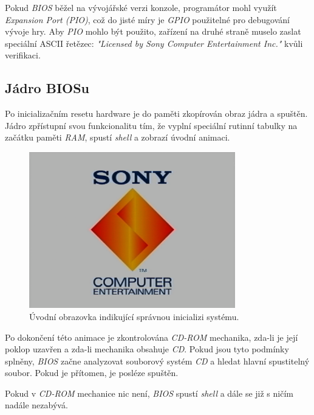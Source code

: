 Pokud \textit{BIOS} běžel na vývojářské verzi konzole, programátor mohl využít \textit{Expansion Port (PIO)}, což
do jisté míry je \textit{GPIO} použitelné pro debugování vývoje hry. Aby \textit{PIO} mohlo být použito,
zařízení na druhé straně muselo zaslat speciální ASCII řetězec: \textit{"Licensed by Sony Computer Entertainment Inc."} kvůli verifikaci.

\subsection{Jádro BIOSu}

Po inicializačním resetu hardware je do paměti zkopírován obraz jádra a spuštěn. 
Jádro zpřístupní svou funkcionalitu tím, že vyplní speciální rutinní tabulky na začátku paměti \textit{RAM}, spustí \textit{shell} a zobrazí úvodní animaci.

\begin{figure}[hbt]
    \centering
    \includegraphics[width=0.8\textwidth]{obrazky-figures/boot-screen.png}
    \caption{Úvodní obrazovka indikující správnou inicializi systému.}
    \label{boot-screen}
\end{figure}

Po dokončení této animace je zkontrolována \textit{CD-ROM} mechanika, zda-li je její poklop uzavřen a zda-li mechanika obsahuje \textit{CD}. 
Pokud jsou tyto podmínky splněny, \textit{BIOS} začne analyzovat souborový systém \textit{CD} a hledat hlavní spustitelný soubor. 
Pokud je přítomen, je posléze spuštěn.

Pokud v \textit{CD-ROM} mechanice nic není, \textit{BIOS} spustí \textit{shell} a dále se již s ničím nadále nezabývá.